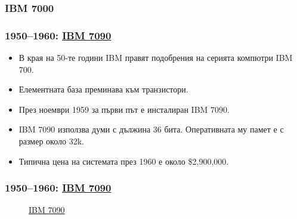 \documentclass[ignorenonframetext, hyperref=unicode]{beamer}
\begin{document}
\subsubsection{IBM 7000}

\begin{frame}
\frametitle{1950--1960: \href{http://en.wikipedia.org/wiki/IBM_7090}{IBM 7090}}
\begin{itemize}
  \item В края на 50-те години IBM правят подобрения на серията компютри IBM 700.
  \item Елементната база преминава към транзистори.
  \item През ноември 1959 за първи път е инсталиран IBM 7090.
  \item IBM 7090 използва думи с дължина 36 бита. Оперативната му памет е с
  размер около 32k.
  \item Типична цена на системата през 1960 е около \$2,900,000.
\end{itemize}
\end{frame}

\begin{frame}
\frametitle{1950--1960: \href{http://en.wikipedia.org/wiki/IBM_7090}{IBM 7090}}
\begin{figure}[h]
\center
{}
\caption{\href{http://en.wikipedia.org/wiki/Image:NASAComputerRoom7090.NARA.jpg}{IBM 7090}}
\end{figure}
\end{frame}
\end{document}
